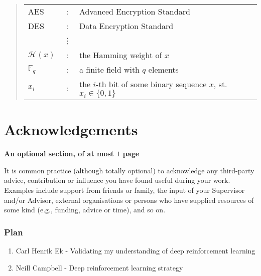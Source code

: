 \documentclass[ %
                    author={Callum Pearce},
                supervisor={Dr. Neill Campbell},
                    degree={MEng},
                     title={How effective are Temporal difference learning methods in reducing the number of zero contribution light paths in Path tracing?},
                  subtitle={},
                      type={research},
                      year={2019} ]{dissertation}
\begin{document}
\begin{quote}
\noindent
\begin{tabular}{lcl}
AES                 &:     & Advanced Encryption Standard                                         \\
DES                 &:     & Data Encryption Standard                                             \\
                    &\vdots&                                                                      \\
${\mathcal H}( x )$ &:     & the Hamming weight of $x$                                            \\
${\mathbb  F}_q$    &:     & a finite field with $q$ elements                                     \\
$x_i$               &:     & the $i$-th bit of some binary sequence $x$, st. $x_i \in \{ 0, 1 \}$ \\
\end{tabular}
\end{quote}


\chapter*{Acknowledgements}

{\bf An optional section, of at most $1$ page}
\vspace{1cm} 

\noindent
It is common practice (although totally optional) to acknowledge any
third-party advice, contribution or influence you have found useful
during your work.  Examples include support from friends or family, 
the input of your Supervisor and/or Advisor, external organisations 
or persons who  have supplied resources of some kind (e.g., funding, 
advice or time), and so on.

\subsection{Plan}
\begin{enumerate}
\item Carl Henrik Ek - Validating my understanding of deep reinforcement learning
\item Neill Campbell - Deep reinforcement learning strategy
\end{enumerate}

\end{document}
